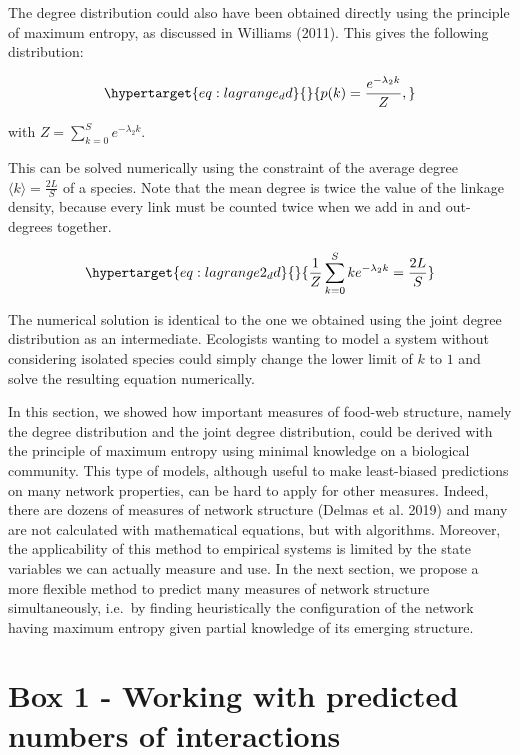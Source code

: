 \documentclass[11pt]{article}
\begin{document}
The degree distribution could also have been obtained directly using the
principle of maximum entropy, as discussed in Williams (2011). This
gives the following distribution:

\begin{equation}\protect\hypertarget{eq:lagrange_dd}{}{p(k) = \frac{e^{-\lambda_2k}}{Z},}\label{eq:lagrange_dd}\end{equation}

with \(Z = \sum_{k=0}^S e^{-\lambda_2k}.\)

This can be solved numerically using the constraint of the average
degree \(\langle k \rangle = \frac{2L}{S}\) of a species. Note that the
mean degree is twice the value of the linkage density, because every
link must be counted twice when we add in and out-degrees together.

\begin{equation}\protect\hypertarget{eq:lagrange2_dd}{}{\frac{1}{Z}\sum_{k=0}^S k e^{-\lambda_2k} = \frac{2L}{S}}\label{eq:lagrange2_dd}\end{equation}

The numerical solution is identical to the one we obtained using the
joint degree distribution as an intermediate. Ecologists wanting to
model a system without considering isolated species could simply change
the lower limit of \(k\) to \(1\) and solve the resulting equation
numerically.

In this section, we showed how important measures of food-web structure,
namely the degree distribution and the joint degree distribution, could
be derived with the principle of maximum entropy using minimal knowledge
on a biological community. This type of models, although useful to make
least-biased predictions on many network properties, can be hard to
apply for other measures. Indeed, there are dozens of measures of
network structure (Delmas et al. 2019) and many are not calculated with
mathematical equations, but with algorithms. Moreover, the applicability
of this method to empirical systems is limited by the state variables we
can actually measure and use. In the next section, we propose a more
flexible method to predict many measures of network structure
simultaneously, i.e.~by finding heuristically the configuration of the
network having maximum entropy given partial knowledge of its emerging
structure.

\hypertarget{box-1---working-with-predicted-numbers-of-interactions}{%
\section{Box 1 - Working with predicted numbers of
interactions}\label{box-1---working-with-predicted-numbers-of-interactions}}
\end{document}
